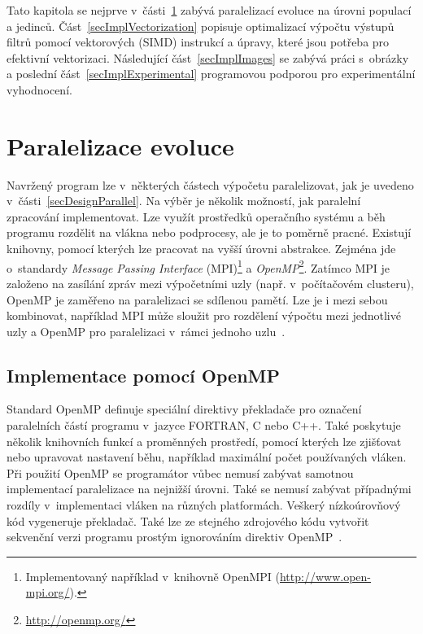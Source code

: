 Tato kapitola se nejprve v~části~\ref{secImplParalelization} zabývá paralelizací evoluce na úrovni populací a jedinců. Část~\ref{secImplVectorization} popisuje optimalizací výpočtu výstupů filtrů pomocí vektorových (SIMD) instrukcí a úpravy, které jsou potřeba pro efektivní vektorizaci. Následující část~\ref{secImplImages} se zabývá práci s~obrázky a poslední část~\ref{secImplExperimental} programovou podporou pro experimentální vyhodnocení.

\section{Paralelizace evoluce}
\label{secImplParalelization}

Navržený program lze v~některých částech výpočetu paralelizovat, jak je uvedeno v~části~\ref{secDesignParallel}. Na výběr je několik možností, jak paralelní zpracování implementovat. Lze využít prostředků operačního systému a běh programu rozdělit na vlákna nebo podprocesy, ale je to poměrně pracné. Existují knihovny, pomocí kterých lze pracovat na vyšší úrovni abstrakce. Zejména jde o~standardy \emph{Message Passing Interface} (MPI)\footnote{Implementovaný například v~knihovně OpenMPI (\url{http://www.open-mpi.org/}).} a \emph{OpenMP}\footnote{\url{http://openmp.org/}}. Zatímco MPI je založeno na zasílání zpráv mezi výpočetními uzly (např. v~počítačovém clusteru), OpenMP je zaměřeno na paralelizaci se sdílenou pamětí. Lze je i mezi sebou kombinovat, například MPI může sloužit pro rozdělení výpočtu mezi jednotlivé uzly a OpenMP pro paralelizaci v~rámci jednoho uzlu~\cite{Quinn}.


\subsection{Implementace pomocí OpenMP}

Standard OpenMP definuje speciální direktivy překladače pro označení paralelních částí programu v~jazyce FORTRAN, C nebo C++. Také poskytuje několik knihovních funkcí a proměnných prostředí, pomocí kterých lze zjišťovat nebo upravovat nastavení běhu, například maximální počet používaných vláken. Při použití OpenMP se programátor vůbec nemusí zabývat samotnou implementací paralelizace na nejnižší úrovni. Také se nemusí zabývat případnými rozdíly v~implementaci vláken na různých platformách. Veškerý nízkoúrovňový kód vygeneruje překladač. Také lze ze stejného zdrojového kódu vytvořit sekvenční verzi programu prostým ignorováním direktiv OpenMP~\cite{Quinn}.

